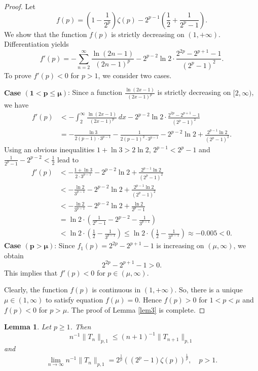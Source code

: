 \documentclass{amsart}
\newtheorem{lemma}{Lemma}
\begin{document}
\begin{proof} Let 
$$f(p)=\left(1-\frac{1}{2^p}\right)\zeta(p)-2^{p-1}\left(\frac{1}{2}+\frac{1}{2^p-1}\right).$$
We show that the function $f(p)$ is strictly decreasing on $(1,+\infty)$.  Differentiation yields
$$f'(p)=-\sum_{n=2}^\infty\frac{\ln(2n-1)}{(2n-1)^p}-2^{p-2}\ln2\cdot\frac{2^{2p}-2^{p+1}-1}{(2^p-1)^2}.$$
To prove $f'(p)<0$ for $p>1$, we consider two cases.

{\bf Case $\boldsymbol{(1< p\leq\mu)}$}: Since a function $\frac{\ln(2x-1)}{(2x-1)^p}$ is strictly decreasing on $[2,\infty)$, we have
\begin{align*}
    f'(p)&<-\int_{2}^\infty\frac{\ln(2x-1)}{(2x-1)^p}\,dx-2^{p-2}\ln2\cdot\frac{2^{2p}-2^{p+1}-1}{(2^p-1)^2}\\
    &=-\frac{\ln3}{2(p-1)\cdot3^{p-1}}-\frac{1}{2(p-1)^2\cdot3^{p-1}}-2^{p-2}\ln2+\frac{2^{p-1}\ln2}{(2^p-1)^2}.
\end{align*}
Using an obvious inequalities $1+\ln3>2\ln2$, $2^{p-1}<2^p-1$ and $\frac{1}{2^p-1}-2^{p-2}<\frac{1}{2}$ lead to 
\begin{align*}
    f'(p)&<-\frac{1+\ln3}{2\cdot3^{p-1}}-2^{p-2}\ln2+\frac{2^{p-1}\ln2}{(2^p-1)^2}\\
    &<-\frac{\ln2}{3^{p-1}}-2^{p-2}\ln2+\frac{2^{p-1}\ln2}{(2^p-1)^2}\\
    &<-\frac{\ln2}{3^{p-1}}-2^{p-2}\ln2+\frac{\ln2}{2^p-1}\\
    &=\ln2\cdot \left(\frac{1}{2^p-1}-2^{p-2}-\frac{1}{3^{p-1}}\right)\\
    &<\ln2\cdot \left(\frac{1}{2}-\frac{1}{3^{p-1}}\right)\leq \ln2\cdot \left(\frac{1}{2}-\frac{1}{3^{\mu-1}}\right)\approx-0.005<0.
\end{align*}
{\bf Case $\boldsymbol{(p>\mu)}$}: Since $f_1(p)=2^{2p}-2^{p+1}-1$ is increasing on $(\mu,\infty)$, we obtain
$$2^{2p}-2^{p+1}-1>0.$$
This implies that $f'(p)<0$ for $p\in(\mu,\infty)$. 

Clearly, the function $f(p)$ is continuous in $(1,+\infty)$. So, there is a unique $\mu\in(1,\infty)$ to satisfy equation $f(\mu)=0$. Hence $f(p)>0$ for $1< p<\mu$ and $f(p)<0$ for $p>\mu$. The proof of Lemma \ref{lem3} is complete.
\end{proof}
\begin{lemma}\label{lem5}
    Let $p\geq1$. Then
   \begin{equation}\label{lem5eq1}
        n^{-1}\|T_n\|_{p,1}\leq (n+1)^{-1}\|T_{n+1}\|_{p,1}
   \end{equation}
    and 
       \begin{equation}\label{lem5eq2}
    \lim_{n\to \infty}n^{-1}\|T_n\|_{p,1}=2^\frac{1}{p}\left(\left(2^p-1\right)\zeta(p)\right)^\frac{1}{p},\quad p>1.
    \end{equation}
\end{lemma}
\end{document}
